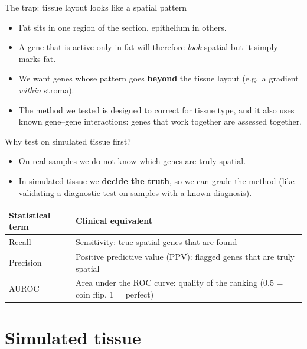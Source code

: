 \documentclass[10pt,aspectratio=169]{beamer}
\begin{document}
\begin{frame}{The trap: tissue layout looks like a spatial pattern}
  \begin{itemize}
    \item Fat sits in one region of the section, epithelium in others.
    \item A gene that is active only in fat will therefore \emph{look} spatial but it simply marks fat.
    \item We want genes whose pattern goes \textbf{beyond} the tissue layout
          (e.g.\ a gradient \emph{within} stroma).
    \item The method we tested is designed to correct for tissue type, and it also uses known
          gene--gene interactions: genes that work together are assessed together.
  \end{itemize}
\end{frame}

\begin{frame}{Why test on simulated tissue first?}
  \begin{itemize}
    \item On real samples we do not know which genes are truly spatial.
    \item In simulated tissue we \textbf{decide the truth}, so we can grade the method (like validating a diagnostic test on samples with a known diagnosis).
  \end{itemize}
  \vspace{3mm}
  \centering
  \begin{tabular}{ll}
    \toprule
    Statistical term & Clinical equivalent \\
    \midrule
    Recall & Sensitivity: true spatial genes that are found \\
    Precision & Positive predictive value (PPV): flagged genes that are truly spatial \\
    AUROC & Area under the ROC curve: quality of the ranking ({\small 0.5 = coin flip, 1 = perfect}) \\
    \bottomrule
  \end{tabular}
\end{frame}

\section{Simulated tissue}
\end{document}
